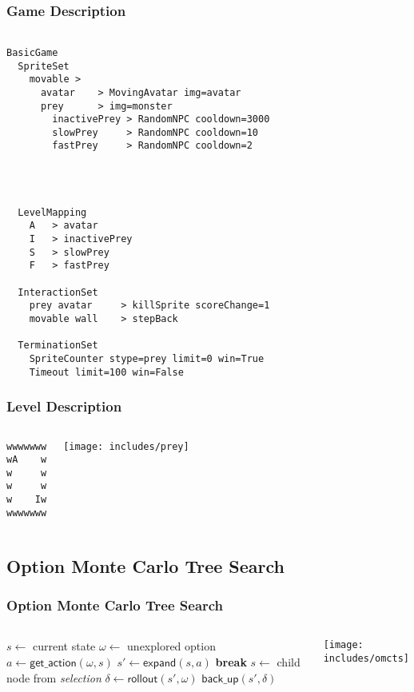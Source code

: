 \documentclass{beamer}
\begin{document}
\begin{frame}
	\frametitle{Game Description}
	\begin{lstlisting}[caption=Game Description, frame=tb]

BasicGame
  SpriteSet
    movable >
      avatar    > MovingAvatar img=avatar
      prey      > img=monster
        inactivePrey > RandomNPC cooldown=3000
        slowPrey     > RandomNPC cooldown=10
        fastPrey     > RandomNPC cooldown=2




  LevelMapping
    A   > avatar
    I   > inactivePrey
    S   > slowPrey
    F   > fastPrey

  InteractionSet
    prey avatar     > killSprite scoreChange=1
    movable wall    > stepBack

  TerminationSet
    SpriteCounter stype=prey limit=0 win=True
    Timeout limit=100 win=False
	\end{lstlisting}
\end{frame}

\begin{frame}[fragile]
	\frametitle{Level Description}
	\begin{columns}[c]
		\centering
		\begin{lstlisting}[caption=Level, frame=tb, xleftmargin=.3\textwidth, xrightmargin=.3\textwidth]
wwwwwww
wA    w
w     w
w     w
w    Iw
wwwwwww
		\end{lstlisting}
		\texttt{[image: includes/prey]}
	\end{columns}
\end{frame}

\subsection[O-MCTS]{Option Monte Carlo Tree Search}
\begin{frame}
	\frametitle{Option Monte Carlo Tree Search}
	\begin{columns}
		\small
		\vspace{-.5em}
		\begin{algorithmic}[1]
				\State $s \gets $ current state
						\State $\omega \gets$ unexplored option
						\State $a \gets \mathsf{get\_action}(\omega, s)$ 
						\State $s' \gets \mathsf{expand}(s, a)$ 
						\State \textbf{break} \label{alg:omcts:break}
					\Else \label{alg:omcts:sexpand}
						\State $s \gets$ child node from \emph{selection}
					\EndIf \label{alg:omcts:eexpand}
				\EndWhile
				\State $\delta \gets \mathsf{rollout}(s', \omega)$
				\State $\mathsf{back\_up}(s', \delta)$
			\EndWhile
			\State {}
		\end{algorithmic}

		\texttt{[image: includes/omcts]}
	\end{columns}
\end{frame}
\end{document}
